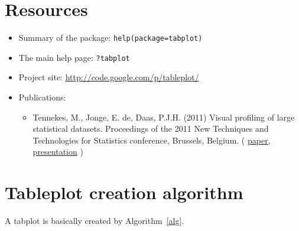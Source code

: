 \documentclass[11pt, fleqn, a4paper]{article}
\begin{document}
\section{Resources}
\begin{itemize}
\item Summary of the package: {\tt help(package=tabplot)}
\item The main help page: {\tt ?tabplot}
\item Project site: \url{http://code.google.com/p/tableplot/}
\item Publications:
\begin{itemize}
\item Tennekes, M., Jonge, E. de, Daas, P.J.H. (2011) Visual profiling of large statistical datasets. Proceedings of the 2011 New Techniques and Technologies for Statistics conference, Brussels, Belgium. (
\href{http://www.von-tijn.nl/tijn/research/publications/Tableplots.pdf}{paper}, 
\href{http://www.von-tijn.nl/tijn/research/presentations/NTTS_tableplots.pdf}{presentation}
)
\end{itemize}
\end{itemize}


\appendix
\newpage
\section{Tableplot creation algorithm}\label{secalg}
A tabplot is basically created by Algorithm~\ref{alg}.
\end{document}
